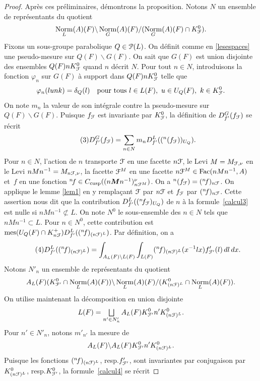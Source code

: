 \documentclass[11pt]{article}
\newcommand{\resp}{resp.\xspace}
\numberwithin{equation}{section}\providecommand{\og}{«\,}\providecommand{\fg}{\,»}
\let\mathcal \EuScript
\let\oldbigsqcup\bigsqcup
\renewcommand{\bigsqcup}{\mathop{\textstyle\oldbigsqcup}\displaylimits}
\newcommand{\nf}{{}^n\!f}
\newcommand{\cusp}{\mathrm{cusp}}
\newcommand{\Fac}{\mathrm{Fac}}
\DeclareMathOperator{\mes}{mes}
\DeclareMathOperator{\Norm}{Norm}
\newcommand{\bM}{\boldsymbol{M}}
\newcommand{\cF}{\mathcal{F}}
\newcommand{\cP}{\mathcal{P}}
\theoremstyle{plain}
\theoremstyle{definition}
\begin{document}
\begin{proof}
Après ces préliminaires, démontrons la proposition. Notons $N$ un ensemble de représentants du quotient
\[
\Norm_{L}(A)(F)\backslash \Norm_{G}(A)(F)/(\Norm_{G}(A)(F)\cap K_{\cF}^0).
\]
Fixons un sous-groupe parabolique $Q \in \cP(L)$. On définit comme en \ref{lesespaces} une pseudo-mesure sur $Q(F)\backslash G(F)$. On sait que $G(F)$ est union disjointe des ensembles $Q(F)nK_{\cF}^0$ quand $n$ décrit $N$. Pour tout $n\in N$, introduisons la fonction $\varphi_{n}$ sur $G(F)$ à support dans $Q(F)nK_{\cF}^0$ telle que
\[
\varphi_{n}(lunk)=\delta_{Q}(l)\quad\text{pour tous } l\in L(F),\ u\in U_{Q}(F),\ k\in K_{\cF}^0.
\]
On note $m_{n}$ la valeur de son intégrale contre la pseudo-mesure sur $Q(F)\backslash G(F)$.
Puisque $f_{\cF}$ est invariante par $K_{\cF}^0$, la définition de $D^G_{f'}(f_{\cF})$ se récrit
\begin{equation}\tag{3}\label{calcul3}
D^G_{f'}(f_{\cF})= \sum_{n\in N}m_{n}D_{f'}^L((^n(f_{\cF}))_{U_{Q}}).
\end{equation}
Pour $n\in N$, l'action de $n$ transporte $\cF$ en une facette $n\cF$, le Levi $M=M_{\cF,\nu}$ en le Levi $nMn^{-1}=M_{n\cF,\nu}$, la facette $\cF^M$ en une facette $n\cF^M\in \Fac(nMn^{-1},A)$ et~$f$ en une fonction $\nf\in C_{\cusp}(({n\bM n^{-1}})_{n\cF^M}^{\nu})$. On a $^n(f_{\cF})=(\nf)_{n\cF}$. On applique le lemme \ref{lem1} en y remplaçant $\cF$ par $n\cF$ et $f_{\cF}$ par $(\nf)_{n\cF}$. Cette assertion nous dit que la contribution $D_{f'}^L((\nf_{\cF})_{U_{Q}})$ de $n$ à la formule~\eqref{calcul3} est nulle si $nMn^{-1}\not\subset L$. On note $N^0$ le sous-ensemble des $n\in N$ tels que $nMn^{-1}\subset L$. Pour $n\in N^0$, cette contribution est $\mes(U_{Q}(F)\cap K_{n\cF}^+)D_{f'}^L((\nf)_{(n\cF)^L})$. Par définition, on a
\begin{equation}\tag{4}\label{calcul4}
D_{f'}^L((\nf)_{(n\cF)^L})=\int_{A_{L}(F)\backslash L(F)} \int_{L(F)}(\nf)_{(n\cF)^L}(x^{-1}lx)f'_{\cF'}(l)\,dl\,dx.
\end{equation}
Notons $ N'_{n}$ un ensemble de représentants du quotient
\[
A_{L}(F)(K_{\cF'}^0\cap \Norm_{L}(A)(F))\backslash \Norm_{L}(A)(F)/(K_{(n\cF)^L}^0\cap \Norm_{L}(A)(F)).
\]
On utilise maintenant la décomposition en union disjointe
\[
L(F)=\bigsqcup_{n'\in N'_{n}} A_{L}(F)K_{\cF'}^0n'K_{(n\cF)^L}^0.
\]
Pour $n'\in N'_{n}$, notons $m'_{n'}$ la mesure de
\[
A_{L}(F)\backslash A_{L}(F)K_{\cF'}^0n'K_{(n\cF)^L}^0.
\]
Puisque les fonctions $(\nf)_{(n\cF)^L}$, \resp $f'_{\cF'}$, sont invariantes par conjugaison par $K_{(n\cF)^L}^0$, \resp $K_{\cF'}^0$, la formule~\eqref{calcul4} se récrit

\end{proof}
\end{document}
